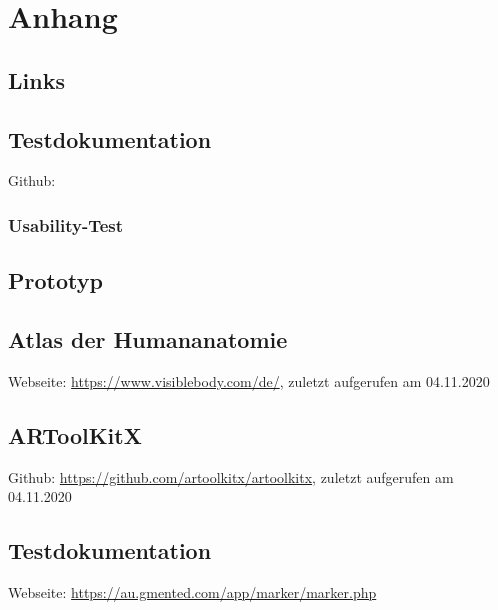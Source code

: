 \chapter{Anhang}


\section{Links}



\section{Testdokumentation}
Github: 

\subsection{Usability-Test}

\section{Prototyp}
\section{Atlas der Humananatomie}
Webseite: \url{https://www.visiblebody.com/de/}, zuletzt aufgerufen am 04.11.2020

\section{ARToolKitX}
Github: \url{https://github.com/artoolkitx/artoolkitx}, zuletzt aufgerufen am 04.11.2020

\section{Testdokumentation}
Webseite: \url{https://au.gmented.com/app/marker/marker.php}


